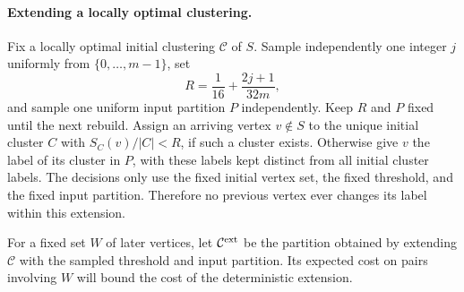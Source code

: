 \documentclass[11pt]{article}
\begin{document}
\paragraph{Extending a locally optimal clustering.}

Fix a locally optimal initial clustering $\mathcal C$ of $S$. Sample independently
one integer $j$ uniformly from $\{0,\ldots,m-1\}$, set
\[
 R=\frac1{16}+\frac{2j+1}{32m},
\]
and sample one uniform input partition $P$ independently. Keep $R$ and
$P$ fixed until the next rebuild.
Assign an arriving vertex $v\notin S$ to the unique initial cluster $C$ with
$S_C(v)/|C|<R$, if such a cluster exists. Otherwise give $v$ the label
of its cluster in $P$, with these labels kept distinct from all initial
cluster labels.  The decisions only use the fixed initial vertex set, the fixed
threshold, and the fixed input partition. Therefore no previous
vertex ever changes its label within this extension.

For a fixed set $W$ of later vertices, let $\mathcal C^{\rm ext}$
be the partition obtained by extending $\mathcal C$ with the sampled
threshold and input partition. Its expected cost on pairs involving
$W$ will bound the cost of the deterministic extension.
\end{document}
